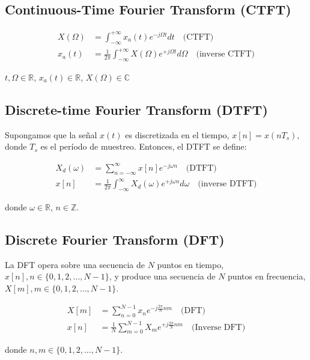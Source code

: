 \subsection{Continuous-Time Fourier Transform (CTFT)}

\begin{align*}
    X(\Omega) &= \int_{-\infty}^{+\infty}x_a(t)e^{-j\Omega t}dt \quad \text{(CTFT)}\\
    x_a(t) &= \frac{1}{2\pi}\int_{-\infty}^{+\infty}X(\Omega)e^{+j\Omega t}d\Omega \quad \text{(inverse CTFT)}
\end{align*}

$t, \Omega \in \mathbb{R}$, $x_a(t)\in \mathbb{R}$, $X(\Omega)\in \mathbb{C}$\\

\subsection{Discrete-time Fourier Transform (DTFT)}

Supongamos que la señal $x(t)$ es discretizada en el tiempo, $x[n] = x(n T_s)$, donde $T_s$ es el período de muestreo. Entonces, el DTFT se define:

\begin{align*}
    X_d(\omega) &= \sum_{n=-\infty}^{\infty}x[n]e^{-j\omega n} \quad \text{(DTFT)}\\
    x[n] &= \frac{1}{2\pi}\int_{-\infty}^{\infty}X_d(\omega)e^{+j\omega n}d\omega \quad \text{(inverse DTFT)}
\end{align*}

donde $\omega \in \mathbb{R}$, $n \in \mathbb{Z}$.

\subsection{Discrete Fourier Transform (DFT)}

La DFT opera sobre una secuencia de $N$ puntos en tiempo, $x[n], n \in \{0,1,2,\ldots,N-1\}$, y produce una secuencia de $N$ puntos en frecuencia, $X[m], m \in \{0,1,2,\ldots,N-1\}$.

\begin{align*}
    X[m] &= \sum_{n=0}^{N-1} x_ne^{-j\frac{2\pi}{N}nm} \quad \text{(DFT)}\\
    x[n] &= \frac{1}{N}\sum_{m=0}^{N-1}X_me^{+j\frac{2\pi}{N}nm} \quad \text{(Inverse DFT)}
\end{align*}

donde $n,m \in \{0,1,2,\ldots,N-1\}$.\\

